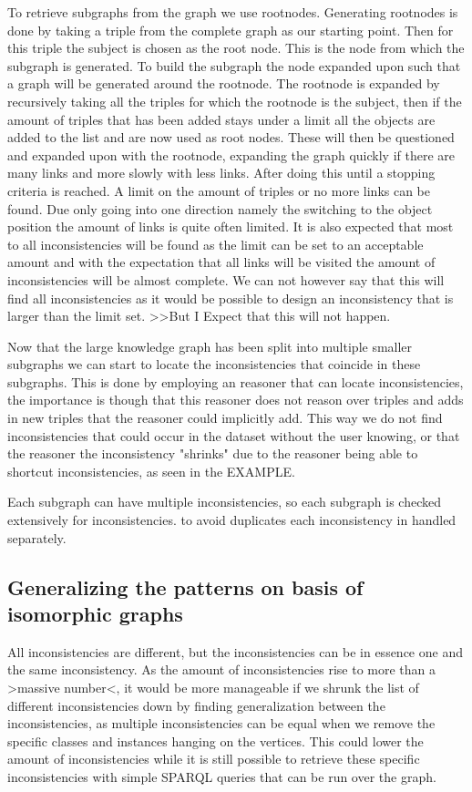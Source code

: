 \documentclass{article}
\begin{document}
To retrieve subgraphs from the graph we use rootnodes. Generating rootnodes is done by taking a triple from the complete graph as our starting point. Then for this triple the subject is chosen as the root node. This is the node from which the subgraph is generated. To build the subgraph the node expanded upon such that a graph will be generated around the rootnode. 
The rootnode is expanded by recursively taking all the triples for which the rootnode is the subject, then if the amount of triples that has been added stays under a limit all the objects are added to the list and are now used as root nodes. These will then be questioned and expanded upon with the rootnode, expanding the graph quickly if there are many links and more slowly with less links. After doing this until a stopping criteria is reached. A limit on the amount of triples or no more links can be found. Due only going into one direction namely the switching to the object position the amount of links is quite often limited. 
It is also expected that most to all inconsistencies will be found as the limit can be set to an acceptable amount and with the expectation that all links will be visited the amount of inconsistencies will be almost complete. We can not however say that this will find all inconsistencies as it would be possible to design an inconsistency that is larger than the limit set. >>But I Expect that this will not happen. %

Now that the large knowledge graph has been split into multiple smaller subgraphs we can start to locate the inconsistencies that coincide in these subgraphs. This is done by employing an reasoner that can locate inconsistencies, the importance is though that this reasoner does not reason over triples and adds in new triples that the reasoner could implicitly add. This way we do not find inconsistencies that could occur in the dataset without the user knowing, or that the reasoner the inconsistency "shrinks" due to the reasoner being able to shortcut inconsistencies, as seen in the EXAMPLE.

Each subgraph can have multiple inconsistencies, so each subgraph is checked extensively for inconsistencies.  to avoid duplicates each inconsistency in handled separately.


\subsection{Generalizing the patterns on basis of isomorphic graphs}
All inconsistencies are different, but the inconsistencies can be in essence one and the same inconsistency. As the amount of inconsistencies rise to more than a >massive number<, it would be more manageable if we shrunk the list of different inconsistencies down by finding generalization between the inconsistencies, as multiple inconsistencies can be equal when we remove the specific classes and instances hanging on the vertices. This could lower the amount of inconsistencies while it is still possible to retrieve these specific inconsistencies with simple SPARQL queries that can be run over the graph. 
\end{document}
